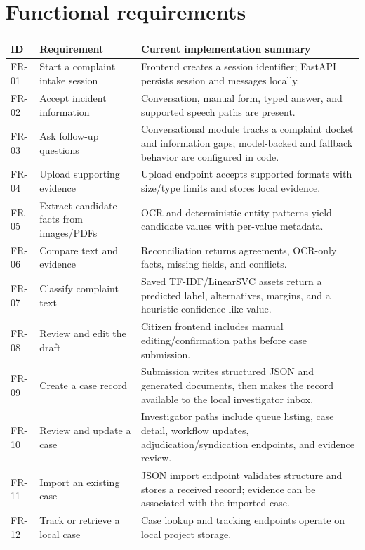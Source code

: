 \documentclass[12pt,a4paper,oneside]{report}
\begin{document}
\section{Functional requirements}
\begin{longtable}{|>{\RaggedRight\arraybackslash}p{}|>{\RaggedRight\arraybackslash}p{}|>{\RaggedRight\arraybackslash}p{}|}
\hline
\textbf{ID} & \textbf{Requirement} & \textbf{Current implementation summary} \\\hline
FR-01 & Start a complaint intake session & Frontend creates a session identifier; FastAPI persists session and messages locally. \\\hline
FR-02 & Accept incident information & Conversation, manual form, typed answer, and supported speech paths are present. \\\hline
FR-03 & Ask follow-up questions & Conversational module tracks a complaint docket and information gaps; model-backed and fallback behavior are configured in code. \\\hline
FR-04 & Upload supporting evidence & Upload endpoint accepts supported formats with size/type limits and stores local evidence. \\\hline
FR-05 & Extract candidate facts from images/PDFs & OCR and deterministic entity patterns yield candidate values with per-value metadata. \\\hline
FR-06 & Compare text and evidence & Reconciliation returns agreements, OCR-only facts, missing fields, and conflicts. \\\hline
FR-07 & Classify complaint text & Saved TF-IDF/LinearSVC assets return a predicted label, alternatives, margins, and a heuristic confidence-like value. \\\hline
FR-08 & Review and edit the draft & Citizen frontend includes manual editing/confirmation paths before case submission. \\\hline
FR-09 & Create a case record & Submission writes structured JSON and generated documents, then makes the record available to the local investigator inbox. \\\hline
FR-10 & Review and update a case & Investigator paths include queue listing, case detail, workflow updates, adjudication/syndication endpoints, and evidence review. \\\hline
FR-11 & Import an existing case & JSON import endpoint validates structure and stores a received record; evidence can be associated with the imported case. \\\hline
FR-12 & Track or retrieve a local case & Case lookup and tracking endpoints operate on local project storage. \\\hline
\end{longtable}
\vspace{2mm}
\end{document}
